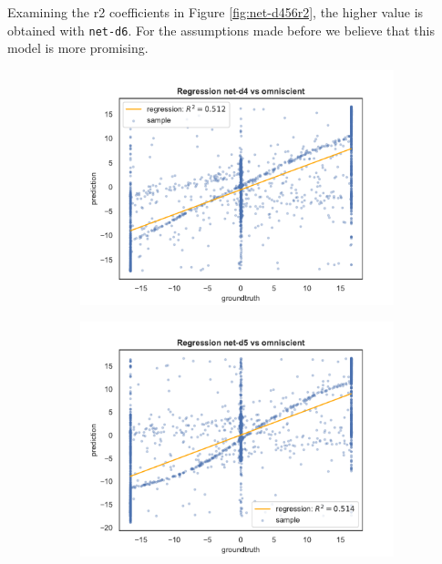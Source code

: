 Examining the \gls{r2} coefficients in Figure \ref{fig:net-d456r2}, the higher 
value is obtained with \texttt{net-d6}. For the assumptions made before we 
believe that this model is more promising. 
\begin{figure}[!htb]
	\begin{center}
		\begin{subfigure}[h]{0.49\textwidth}
			\includegraphics[width=\textwidth]{contents/images/net-d4/regression-net-d4-vs-omniscient}%
		\end{subfigure}
		\hfill\vspace{-0.5cm}
		\begin{subfigure}[h]{0.49\textwidth}
			\includegraphics[width=\textwidth]{contents/images/net-d5/regression-net-d5-vs-omniscient}%

\end{subfigure}
\end{center}
\end{figure}
